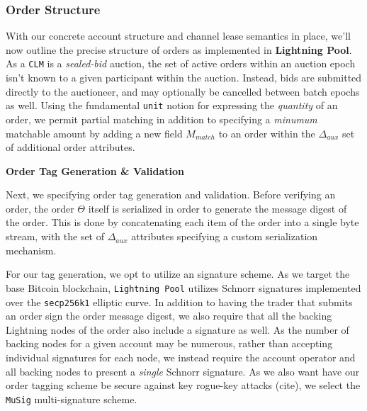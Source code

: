 \documentclass[10pt,a4paper]{article}
\theoremstyle{definition}
\begin{document}
\subsubsection{Order Structure}

With our concrete account structure and channel lease semantics in place, we'll
now outline the precise structure of orders as implemented in \textbf{Lightning
Pool}. As a \texttt{CLM} is a \emph{sealed-bid} auction, the set of active
orders within an auction epoch isn't known to a given participant within the
auction. Instead, bids are submitted directly to the auctioneer, and may
optionally be cancelled between batch epochs as well. Using the fundamental
\texttt{unit} notion for expressing the \emph{quantity} of an order, we permit
partial matching in addition to specifying a \emph{minumum} matchable amount by
adding a new field $M_{match}$ to an order within the $\Delta_{aux}$ set of
additional order attributes.


\begin{center}
    \textbf{Order Tag Generation \& Validation}
\end{center}

Next, we specifying order tag generation and validation. Before verifying an
order, the order $\Theta$ itself is serialized in order to generate the message
digest of the order.  This is done by concatenating each item of the order
into a single byte stream, with the set of $\Delta_{aux}$ attributes specifying
a custom serialization mechanism. 

For our tag generation, we opt to utilize an \seufcma \enspace signature scheme. As we
target the base Bitcoin blockchain, \texttt{Lightning Pool} utilizes Schnorr
signatures implemented over the \texttt{secp256k1} elliptic curve. In addition
to having the trader that submits an order sign the order message digest, we
also require that all the backing Lightning nodes of the order also include a
signature as well.  As the number of backing nodes for a given account may be
numerous, rather than accepting individual signatures for each node, we instead
require the account operator and all backing nodes to present a \emph{single}
Schnorr signature. As we also want have our order tagging scheme be secure
against key rogue-key attacks (cite), we select the \texttt{MuSig}
multi-signature scheme. \\
\end{document}

